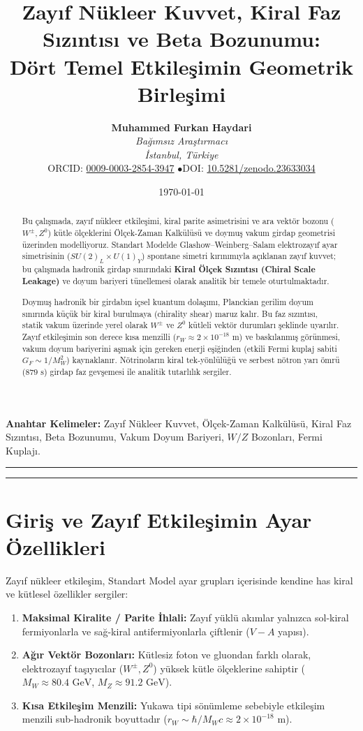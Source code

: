 \documentclass[11pt,a4paper]{article}
\title{\textbf{Zayıf Nükleer Kuvvet, Kiral Faz Sızıntısı ve Beta Bozunumu: \\ Dört Temel Etkileşimin Geometrik Birleşimi}}
\author{
    \textbf{Muhammed Furkan Haydari} \\
    \textit{Bağımsız Araştırmacı} \\
    \textit{İstanbul, Türkiye} \\
    \small ORCID: \href{https://orcid.org/0009-0003-2854-3947}{0009-0003-2854-3947} \quad$\bullet$\quad \small DOI: \href{https://doi.org/10.5281/zenodo.23633034}{10.5281/zenodo.23633034}
}
\date{\today}
\begin{document}
\maketitle

\begin{abstract}
    Bu çalışmada, zayıf nükleer etkileşimi, kiral parite asimetrisini ve ara vektör bozonu ($W^\pm, Z^0$) kütle ölçeklerini Ölçek-Zaman Kalkülüsü ve doymuş vakum girdap geometrisi üzerinden modelliyoruz. Standart Modelde Glashow--Weinberg--Salam elektrozayıf ayar simetrisinin ($SU(2)_L \times U(1)_Y$) spontane simetri kırınımıyla açıklanan zayıf kuvvet; bu çalışmada hadronik girdap sınırındaki \textbf{Kiral Ölçek Sızıntısı (Chiral Scale Leakage)} ve doyum bariyeri tünellemesi olarak analitik bir temele oturtulmaktadır.

    Doymuş hadronik bir girdabın içsel kuantum dolaşımı, Planckian gerilim doyum sınırında küçük bir kiral burulmaya (chirality shear) maruz kalır. Bu faz sızıntısı, statik vakum üzerinde yerel olarak $W^\pm$ ve $Z^0$ kütleli vektör durumları şeklinde uyarılır. Zayıf etkileşimin son derece kısa menzilli ($r_W \approx 2 \times 10^{-18}\text{ m}$) ve baskılanmış görünmesi, vakum doyum bariyerini aşmak için gereken enerji eşiğinden (etkili Fermi kuplaj sabiti $G_F \sim 1/M_W^2$) kaynaklanır. Nötrinoların kiral tek-yönlülüğü ve serbest nötron yarı ömrü ($879\text{ s}$) girdap faz gevşemesi ile analitik tutarlılık sergiler.
\end{abstract}

\vspace{1em}
\noindent\textbf{Anahtar Kelimeler:} Zayıf Nükleer Kuvvet, Ölçek-Zaman Kalkülüsü, Kiral Faz Sızıntısı, Beta Bozunumu, Vakum Doyum Bariyeri, $W/Z$ Bozonları, Fermi Kuplajı.

\vspace{1em}
\hrule
\vspace{0.8em}
\tableofcontents
\vspace{0.8em}
\hrule
\vspace{1.5em}

\section{Giriş ve Zayıf Etkileşimin Ayar Özellikleri}
\label{sec:giris}

Zayıf nükleer etkileşim, Standart Model ayar grupları içerisinde kendine has kiral ve kütlesel özellikler sergiler:
\begin{enumerate}
    \item \textbf{Maksimal Kiralite / Parite İhlali:} Zayıf yüklü akımlar yalnızca sol-kiral fermiyonlarla ve sağ-kiral antifermiyonlarla çiftlenir ($V-A$ yapısı).
    \item \textbf{Ağır Vektör Bozonları:} Kütlesiz foton ve gluondan farklı olarak, elektrozayıf taşıyıcılar ($W^\pm, Z^0$) yüksek kütle ölçeklerine sahiptir ($M_W \approx 80.4\text{ GeV}$, $M_Z \approx 91.2\text{ GeV}$).
    \item \textbf{Kısa Etkileşim Menzili:} Yukawa tipi sönümleme sebebiyle etkileşim menzili sub-hadronik boyuttadır ($r_W \sim \hbar / M_W c \approx 2 \times 10^{-18}\text{ m}$).
\end{enumerate}
\end{document}
